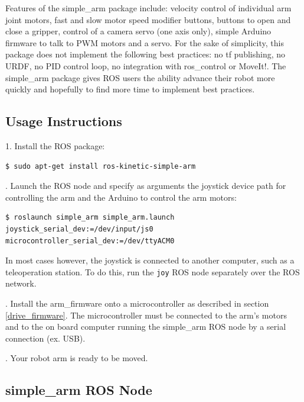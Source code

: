 \documentclass[runningheads,a4paper]{llncs}
\begin{document}

Features of the simple\_arm package include: velocity control of individual arm joint motors, fast and slow motor speed modifier buttons, buttons to open and close a gripper, control of a camera servo (one axis only), simple Arduino firmware to talk to PWM motors and a servo. For the sake of simplicity, this package does not implement the following best practices: no tf publishing, no URDF, no PID control loop, no integration with ros\_control or MoveIt!. The simple\_arm package gives ROS users the ability advance their robot more quickly and hopefully to find more time to implement best practices.

\subsection{Usage Instructions}

1. Install the ROS package:

\begin{lstlisting}[frame=single,basicstyle=\ttfamily\footnotesize]
$ sudo apt-get install ros-kinetic-simple-arm
\end{lstlisting}

. Launch the ROS node and specify as arguments the joystick device path for controlling the arm and the Arduino to control the arm motors:

\begin{lstlisting}[frame=single,basicstyle=\ttfamily\footnotesize]
$ roslaunch simple_arm simple_arm.launch joystick_serial_dev:=/dev/input/js0 microcontroller_serial_dev:=/dev/ttyACM0
\end{lstlisting}

In most cases however, the joystick is connected to another computer, such as a teleoperation station. To do this, run the \texttt{joy} ROS node separately over the ROS network.

. Install the arm\_firmware onto a microcontroller as described in section \ref{drive_firmware}. The microcontroller must be connected to the arm's motors and to the on board computer running the simple\_arm ROS node by a serial connection (ex. USB).

. Your robot arm is ready to be moved.

\subsection{simple\_arm ROS Node}
\end{document}
